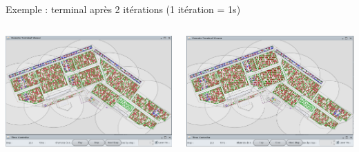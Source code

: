 \documentclass{beamer}
\begin{document}
\begin{frame}{Exemple : terminal après 2 itérations (1 itération = 1s)}
 \begin{columns}
    \begin{column}[l]{6.5cm}	
\begin{center}  
    \includegraphics[width=.85\textheight]{fig/capture3m33s.png}
\end{center}
    \end{column}
   
    \begin{column}[r]{6.5cm}	
\begin{center}      
\includegraphics[width=.85\textheight]{fig/capture3m35s.png}
\end{center}
   \end{column}
\end{columns}
\end{frame}
\end{document}
